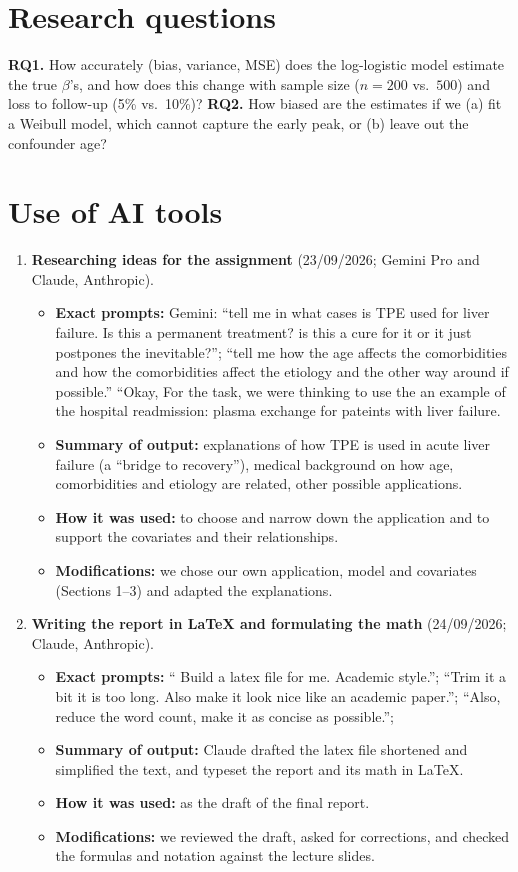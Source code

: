 \documentclass[10pt,a4paper]{article}
\begin{document}
\section{Research questions}
\textbf{RQ1.} How accurately (bias, variance, MSE) does the log-logistic model estimate the true $\beta$'s, and how does this change with sample size ($n=200$ vs.\ $500$) and loss to follow-up (5\% vs.\ 10\%)?
\textbf{RQ2.} How biased are the estimates if we (a) fit a Weibull model, which cannot capture the early peak, or (b) leave out the confounder age?

\newpage
\section*{Use of AI tools}
\begin{enumerate}[leftmargin=1.4em,itemsep=4pt]
\item \textbf{Researching ideas for the assignment} (23/09/2026; Gemini Pro and Claude, Anthropic).
\begin{itemize}
\item \textbf{Exact prompts:} Gemini: ``tell me in what cases is TPE used for liver failure. Is this a permanent treatment? is this a cure for it or it just postpones the inevitable?''; ``tell me how the age affects the comorbidities and how the comorbidities affect the etiology and the other way around if possible.'' ``Okay, For the task, we were thinking to use the an example of the hospital readmission: plasma exchange for pateints with liver failure.
\item \textbf{Summary of output:} explanations of how TPE is used in acute liver failure (a ``bridge to recovery''), medical background on how age, comorbidities and etiology are related, other possible applications.
\item \textbf{How it was used:} to choose and narrow down the application and to support the covariates and their relationships.
\item \textbf{Modifications:} we chose our own application, model and covariates (Sections 1--3) and adapted the explanations.
\end{itemize}
\item \textbf{Writing the report in LaTeX and formulating the math} (24/09/2026; Claude, Anthropic).
\begin{itemize}
\item \textbf{Exact prompts:} `` Build a latex file for me. Academic style.''; ``Trim it a bit it is too long. Also make it look nice like an academic paper.''; ``Also, reduce the word count, make it as concise as possible.'';
\item \textbf{Summary of output:} Claude drafted the latex file shortened and simplified the text, and typeset the report and its math in LaTeX.
\item \textbf{How it was used:} as the draft of the final report.
\item \textbf{Modifications:} we reviewed the draft, asked for corrections, and checked the formulas and notation against the lecture slides.
\end{itemize}
\end{enumerate}
\end{document}
